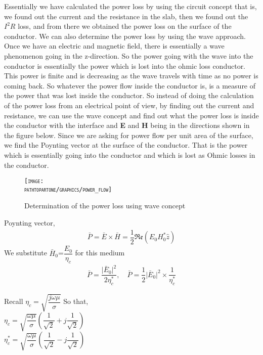 Essentially we have calculated the power loss by using the circuit concept that is, we found out the current and the resistance in the slab, then we found out the $I^{2}R$ loss, and from there we obtained the power loss on the surface of the conductor. We can also determine the power loss by using the wave approach. Once we have an electric and magnetic field, there is essentially a wave phenomenon going in the z-direction. So the power going with the wave into the conductor is essentially the power which is lost into the ohmic loss conductor. This power is finite and is decreasing as the wave travels with time as no power is coming back. So whatever the power flow inside the conductor is, is a measure of the power that was lost inside the conductor. So instead of doing the calculation of the power loss from an electrical point of view, by finding out the current and resistance, we can use the wave concept and find out what the power loss is inside the conductor with the interface and \textbf{E} and \textbf{H} being in the directions shown in the figure below. Since we are asking for power flow per unit area of the surface, we find the Poynting vector at the surface of the conductor. That is the power which is essentially going into the conductor and which is lost as Ohmic losses in the conductor.

\begin{figure}
\centering
\textsc{\texttt{[image: \\pathtopartone/graphics/power\_flow]}}
\caption{Determination of the power loss using wave concept}
\end{figure}

Poynting vector,
\begin{align}
\bar{P}=\bar{E}\times \bar{H}=\dfrac{1}{2}\mathfrak{Re}(E_{0}H_{0}^{\ast}\hat{z})
\end{align} 
We substitute $\bar{H}$$_{0}$=$\dfrac{E_{0}}{\eta_{c}}$ for this medium
\begin{align}
\bar{P}=\dfrac{\lvert\bar{E}_{0}\rvert^{2}}{2\eta_{c}^{\ast}},\quad
\bar{P}=\dfrac{1}{2}\lvert\bar{E}_{0}\rvert^{2}\times \dfrac{1}{\eta_{c}^{\ast}}
\end{align}

Recall  $\eta_{c}=\sqrt{\dfrac{j\omega\mu}{\sigma}}$
So that,\\
$\eta_{c}=\sqrt{\dfrac{\omega\mu}{\sigma}}(\dfrac{1}{\sqrt{2}}+j\dfrac{1}{\sqrt{2}})$\\
$\eta_{c}^{\ast}=\sqrt{\dfrac{\omega\mu}{\sigma}}(\dfrac{1}{\sqrt{2}}-j\dfrac{1}{\sqrt{2}})$\\

